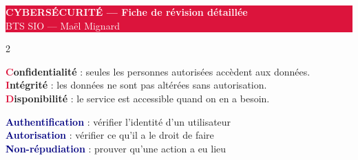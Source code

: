 \documentclass[a4paper,10pt]{article}
\newcommand{\key}[1]{\textbf{\textcolor{navy}{#1}}}
\begin{document}
\begin{center}
  \colorbox{crimson}{\parbox{\dimexpr\textwidth-2\fboxsep}{
    \centering\vspace{3pt}
    {\LARGE\bfseries\textcolor{white}{CYBERSÉCURITÉ — Fiche de révision détaillée}}\\
    {\normalsize\textcolor{white}{BTS SIO — Maël Mignard}}
    \vspace{3pt}
  }}
\end{center}
\vspace{6pt}

\begin{multicols}{2}

\begin{tcolorbox}[basebox, colframe=crimson, title=1. Triade CIA — Piliers fondamentaux]
\begin{tcolorbox}[colback=red!5, colframe=crimson, boxrule=0.3mm, arc=1mm]
  \textbf{\textcolor{crimson}{C}onfidentialité} : seules les personnes autorisées accèdent aux données.\\
  \textbf{\textcolor{crimson}{I}ntégrité} : les données ne sont pas altérées sans autorisation.\\
  \textbf{\textcolor{crimson}{D}isponibilité} : le service est accessible quand on en a besoin.
\end{tcolorbox}
\vspace{4pt}
\key{Authentification} : vérifier l'identité d'un utilisateur \\
\key{Autorisation} : vérifier ce qu'il a le droit de faire \\
\key{Non-répudiation} : prouver qu'une action a eu lieu
\end{tcolorbox}


\end{multicols}
\end{document}
